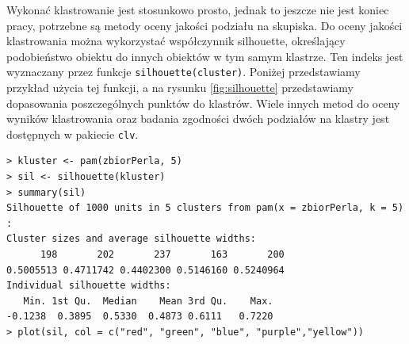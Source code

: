 \documentclass[polish,]{book}
\begin{document}
Wykonać klastrowanie jest stosunkowo prosto, jednak to jeszcze nie jest koniec
pracy, potrzebne są metody oceny jakości podziału na skupiska. Do oceny jakości
klastrowania można wykorzystać współczynnik silhouette, określający podobieństwo
obiektu do innych obiektów w tym samym klastrze. Ten indeks jest wyznaczany przez
funkcje \texttt{silhouette(cluster)}. Poniżej przedstawiamy przykład użycia tej funkcji,
a na rysunku \ref{fig:silhouette} przedstawiamy dopasowania poszczególnych punktów do klastrów.
Wiele innych metod do oceny wyników klastrowania oraz badania zgodności dwóch
podziałów na klastry jest dostępnych w pakiecie \texttt{clv}.

\begin{verbatim}
> kluster <- pam(zbiorPerla, 5)
> sil <- silhouette(kluster)
> summary(sil)
Silhouette of 1000 units in 5 clusters from pam(x = zbiorPerla, k = 5) :
Cluster sizes and average silhouette widths:
      198       202       237       163       200
0.5005513 0.4711742 0.4402300 0.5146160 0.5240964
Individual silhouette widths:
   Min. 1st Qu.  Median    Mean 3rd Qu.    Max.
-0.1238  0.3895  0.5330  0.4873 0.6111   0.7220
> plot(sil, col = c("red", "green", "blue", "purple","yellow"))
\end{verbatim}
\end{document}

